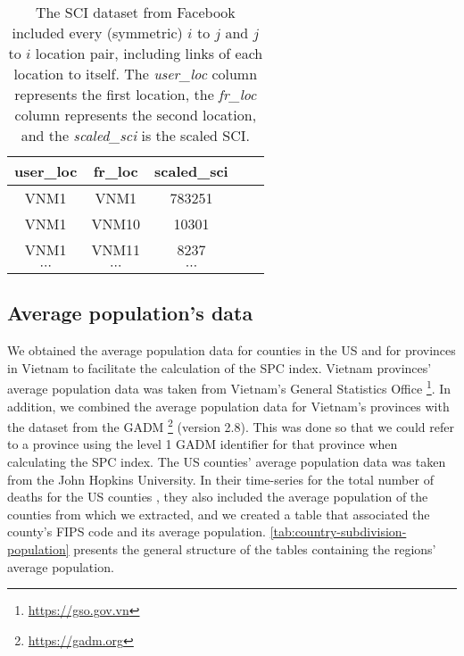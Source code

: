\begin{table}[h]
\centering
\begin{tabular}{| c | c | c | c | c |}
    user\_loc & fr\_loc & scaled\_sci \\
    \hline\hline
    VNM1 & VNM1 & 783251 \\
    \hline
    VNM1 & VNM10 & 10301 \\
    \hline
    VNM1 & VNM11 & 8237 \\
    \hline
    $\cdots$ & $\cdots$ & $\cdots$ \\
\end{tabular}
\caption{The \gls{SCI} dataset from Facebook included every (symmetric) $i$ to $j$ and $j$ to $i$ location pair, including links of each location to itself. The \textit{user\_loc} column represents the first location, the \textit{fr\_loc} column represents the second location, and the \textit{scaled\_sci} is the scaled \gls{SCI}.}
\label{tab:facebook-social-connectedness-index}
\end{table}

\subsection{Average population's data}

We obtained the average population data for counties in the \gls{US} and for provinces in Vietnam to facilitate the calculation of the \gls{SPC} index.
Vietnam provinces' average population data was taken from Vietnam's General Statistics Office \footnote{\url{https://gso.gov.vn}}.
In addition, we combined the average population data for Vietnam's provinces with the dataset from the \gls{GADM} \footnote{\url{https://gadm.org}} (version 2.8).
This was done so that we could refer to a province using the level 1 \gls{GADM} identifier for that province when calculating the \gls{SPC} index.
The \gls{US} counties' average population data was taken from the John Hopkins University.
In their time-series for the total number of deaths for the \gls{US} counties \cite{dongInteractiveWebbasedDashboard2020}, they also included the average population of the counties from which we extracted, and we created a table that associated the county's \gls{FIPS} code and its average population.
\autoref{tab:country-subdivision-population} presents the general structure of the tables containing the regions' average population.

